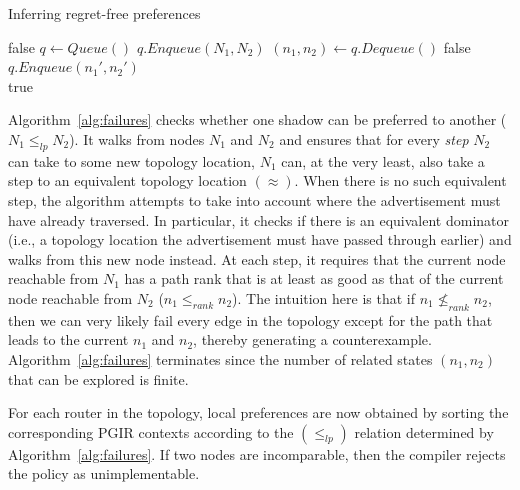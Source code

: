 \documentclass[10pt]{sigalternate052015}
\begin{document}
\begin{algorithm}[t!]
\caption{Inferring regret-free preferences}
\label{alg:failures}
\begin{algorithmic}[1]
   \Return false
  \EndIf
  \State $q \gets Queue()$
  \State $q.Enqueue (N_1, N_2)$
    \State $(n_1,n_2) \gets q.Dequeue()$
      \Return false
    \EndIf
          \State $q.Enqueue(n_1',n_2')$
        \EndIf
      \EndIf
    \EndFor
  \EndWhile \\
  \hspace{\algorithmicindent} \Return true
\EndProcedure
\end{algorithmic}
\end{algorithm}


Algorithm~\ref{alg:failures} checks whether one shadow can be preferred to another ($N_1 \leq_{lp} N_2$). It walks from nodes $N_1$ and $N_2$ and ensures that for every \textit{step} $N_2$ can take to some new topology location, $N_1$ can, at the very least, also take a step to an equivalent topology location $(\approx)$. When there is no such equivalent step, the algorithm attempts to take into account where the advertisement must have already traversed. In particular, it checks if there is an equivalent dominator (i.e., a topology location the advertisement must have passed through earlier) and walks from this new node instead.
At each step, it requires that the current node reachable from $N_1$ has a path rank that is at least as good as that of the current node reachable from $N_2$ ($n_1 \leq_{rank} n_2$). The intuition here is that if $n_1 \nleq_{rank} n_2$, then we can very likely fail every edge in the topology except for the path that leads to the current $n_1$ and $n_2$, thereby generating a counterexample.
Algorithm~\ref{alg:failures} terminates since the number of related states $(n_1,n_2)$ that can be explored is finite.

For each router in the topology, local preferences are now obtained by sorting the corresponding PGIR contexts according to the $(\leq_{lp})$ relation determined by Algorithm~\ref{alg:failures}. If two nodes are incomparable, then the compiler rejects the policy as unimplementable.
\end{document}
